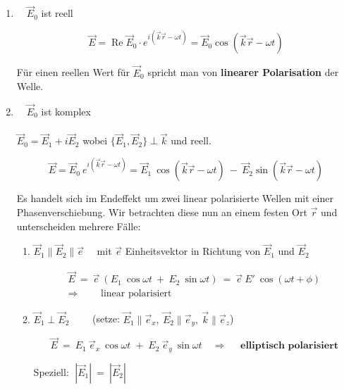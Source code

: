 \begin{enumerate}

\item $ \quad \vec{E}_0$ ist reell

\begin{equation*}
\vec{E} = \operatorname{Re} \vec{E}_0 \cdot e^{i(\vec{k}\vec{r}-\omega t)} = \vec{E}_0 \cos(\vec{k}\vec{r}-\omega t) 
\end{equation*}

Für einen reellen Wert für $\vec{E}_0$ spricht man von \textbf{linearer Polarisation} der Welle.

\item $\quad \vec{E}_0$ ist komplex\\
\ \\
$\vec{E}_0 =\vec{E}_1 + i\vec{E}_2$ wobei $\{\vec{E}_1,\vec{E}_2 \}\perp\vec{k}$ und reell.

\begin{equation*}
\vec{E} = \vec{E}_0 \ e^{i(\vec{k}\vec{r}-\omega t)} = \vec{E}_1 \ \cos(\vec{k}\vec{r}-\omega t) \ - \ \vec{E}_2 \sin (\vec{k}\vec{r} - \omega t)
\end{equation*}

Es handelt sich im Endeffekt um zwei linear polarisierte Wellen mit einer Phasenverschiebung. Wir betrachten diese nun an einem festen Ort $\vec{r}$ und unterscheiden mehrere Fälle:

\begin{enumerate}
\item $\vec{E}_1\parallel\vec{E}_2\parallel\vec{e} \quad $ mit $\vec{e}$ Einheitsvektor in Richtung von $\vec{E}_1$ und $\vec{E}_2$

\begin{align*}
\vec{E} \ = \ \vec{e} \ (E_1 \ \cos \omega t \ + \ E_2 \ \sin \omega t) \  = \  \vec{e}  \ E' \ \cos(\omega t + \phi)\\
\Rightarrow \qquad \text{ linear polarisiert}
\end{align*}

\item $\vec{E}_1\perp\vec{E}_2 \qquad$ (setze: $\vec{E}_1\parallel\vec{e}_x, \  \vec{E}_2\parallel\vec{e}_y, \  \vec{k}\parallel\vec{e}_z$)

\begin{equation*}
\vec{E} \ = \ E_1 \ \vec{e}_x \ \cos \omega t \; + \; E_2 \ \vec{e}_y \ \sin\omega t
\quad\Rightarrow \quad \textbf{ elliptisch polarisiert}
\end{equation*}

Speziell: $ \; |\vec{E}_1| \ = \ |\vec{E}_2| $


\end{enumerate}
\end{enumerate}
